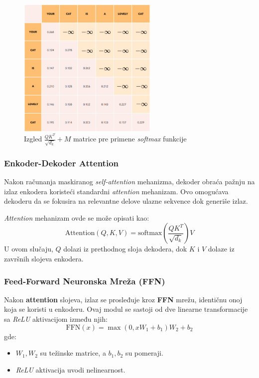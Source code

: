 \documentclass[12pt]{article}
\begin{document}
   \begin{figure}[h!]
      \centering
      \includegraphics[width=0.6\textwidth]{masked_attention.png}
      \caption{Izgled $\frac{QK^T}{\sqrt{d_k}} + M$ matrice pre primene \textit{softmax} funkcije}
      \label{fig:masked_attention}
   \end{figure}

   \subsubsection*{Enkoder-Dekoder Attention}

   Nakon računanja maskiranog \textit{self-attention} mehanizma, dekoder obraća pažnju na 
   izlaz enkodera koristeći standardni \textit{attention} mehanizam. Ovo omogućava dekoderu da 
   se fokusira na relevantne delove ulazne sekvence dok generiše izlaz.

   \textit{Attention} mehanizam ovde se može opisati kao:
   \[
   \text{Attention}(Q, K, V) = \text{softmax}\left(\frac{QK^T}{\sqrt{d_k}}\right)V
   \]
   U ovom slučaju, \( Q \) dolazi iz prethodnog sloja dekodera, dok \( K \) i \( V \) 
   dolaze iz završnih slojeva enkodera.

   \subsubsection*{Feed-Forward Neuronska Mreža (FFN)}
   Nakon \textbf{attention} slojeva, izlaz se prosleđuje kroz \textbf{FFN} mrežu, 
   identičnu onoj koja se koristi u enkoderu. Ovaj modul se sastoji od dve 
   linearne transformacije sa \textit{ReLU} aktivacijom između njih:
   \[
   \text{FFN}(x) = \max(0, xW_1 + b_1)W_2 + b_2
   \]
   gde:
   \begin{itemize}
      \item \( W_1, W_2 \) su težinske matrice, a \( b_1, b_2 \) su pomeraji.
      \item \textit{ReLU} aktivacija uvodi nelinearnost.
   \end{itemize}
\end{document}
